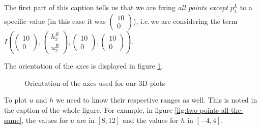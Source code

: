 \documentclass{article}
\begin{document}
The first part of this caption tells us that we are fixing \emph{all points except} $p_1^L$ to a specific value (in this case it was $
\begin{pmatrix}
  10 \\ 0
\end{pmatrix}
$), i.e.\,we are considering the term $I\left(
  \begin{pmatrix}
    10 \\ 0
  \end{pmatrix},
  \begin{pmatrix}
    h_2^R \\ u_2^R
  \end{pmatrix},
  \begin{pmatrix}
    10 \\ 0
  \end{pmatrix},
  \begin{pmatrix}
    10 \\ 0
  \end{pmatrix}
\right)$.


The orientation of the axes is displayed in figure \ref{fig:orientation-of-axes}.

\begin{figure}[th]
  \centering
  \caption{Orientation of the axes used for our 3D plots}
  \label{fig:orientation-of-axes}
\end{figure}

To plot $u$ and $h$ we need to know their respective ranges as well. This is noted in the caption of the whole figure. For example, in figure \ref{fig:two-points-all-the-same}, the values for $u$ are in $[8, 12]$ and the values for $h$ in $[-4,4]$.

\end{document}
